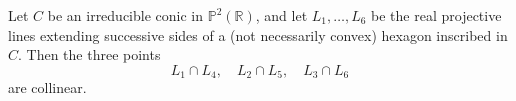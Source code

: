 Let $C$ be an irreducible conic in $\mathbb{P}^2(\mathbb{R})$, and let $L_1, \ldots, L_6$ be the real projective lines extending successive sides of a (not necessarily convex) hexagon inscribed in $C$. Then the three points
$$L_1 \cap L_4, \quad L_2 \cap L_5, \quad L_3 \cap L_6$$
are collinear.

